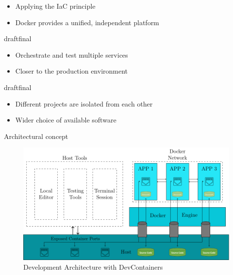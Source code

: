 \documentclass{beamer}
\def\final{final}
\def\status{draft}
\begin{document}
\begin{frame}{}
  \begin{block}{}
    \begin{itemize}
      \item Applying the IaC principle
      \item Docker provides a unified, independent platform
    \end{itemize}
  \end{block}

  \ifx\status\final{}
    \pause{}
  \fi


  \begin{block}{}
    \begin{itemize}
      \item Orchestrate and test multiple services
      \item Closer to the production environment
    \end{itemize}
  \end{block}

  \ifx\status\final{}
    \pause{}
  \fi


  \begin{block}{}
    \begin{itemize}
      \item Different projects are isolated from each other
      \item Wider choice of available software
    \end{itemize}
  \end{block}
\end{frame}

\begin{frame}{}
  \vspace{-0.2cm}
  \begin{center}
    \large Architectural concept
  \end{center}
  \vspace{-0.4cm}
  \begin{figure}
    \includegraphics[width=\textwidth]{img/thesis_main-figure2.pdf}
    \caption{Development Architecture with DevContainers}
  \end{figure}
\end{frame}
\end{document}
